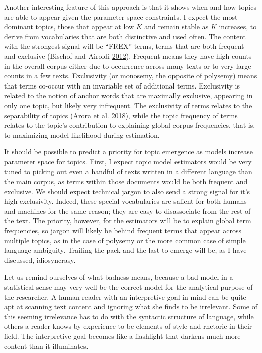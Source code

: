 \documentclass[]{book}
\theoremstyle{definition}
\theoremstyle{definition}
\theoremstyle{definition}
\theoremstyle{remark}
\begin{document}
Another interesting feature of this approach is that it shows when and
how topics are able to appear given the parameter space constraints. I
expect the most dominant topics, those that appear at low \(K\) and
remain stable as \(K\) increases, to derive from vocabularies that are
both distinctive and used often. The content with the strongest signal
will be ``FREX'' terms, terms that are both frequent and exclusive
(Bischof and Airoldi
\protect\hyperlink{ref-Bischof2012Summarizing}{2012}). Frequent means
they have high counts in the overall corpus either due to occurrence
across many texts or to very large counts in a few texts. Exclusivity
(or monosemy, the opposite of polysemy) means that terms co-occur with
an invariable set of additional terms. Exclusivity is related to the
notion of anchor words that are maximally exclusive, appearing in only
one topic, but likely very infrequent. The exclusivity of terms relates
to the separability of topics (Arora et al.
\protect\hyperlink{ref-Arora2018Learning}{2018}), while the topic
frequency of terms relates to the topic's contribution to explaining
global corpus frequencies, that is, to maximizing model likelihood
during estimation.

It should be possible to predict a priority for topic emergence as
models increase parameter space for topics. First, I expect topic model
estimators would be very tuned to picking out even a handful of texts
written in a different language than the main corpus, as terms within
those documents would be both frequent and exclusive. We should expect
technical jargon to also send a strong signal for it's high exclusivity.
Indeed, these special vocabularies are salient for both humans and
machines for the same reason; they are easy to disassociate from the
rest of the text. The priority, however, for the estimators will be to
explain global term frequencies, so jargon will likely be behind
frequent terms that appear across multiple topics, as in the case of
polysemy or the more common case of simple language ambiguity. Trailing
the pack and the last to emerge will be, as I have discussed,
idiosyncrasy.

Let us remind ourselves of what badness means, because a bad model in a
statistical sense may very well be the correct model for the analytical
purpose of the researcher. A human reader with an interpretive goal in
mind can be quite apt at scanning text content and ignoring what she
finds to be irrelevant. Some of this seeming irrelevance has to do with
the syntactic structure of language, while others a reader knows by
experience to be elements of style and rhetoric in their field. The
interpretive goal becomes like a flashlight that darkens much more
content than it illuminates.
\end{document}
